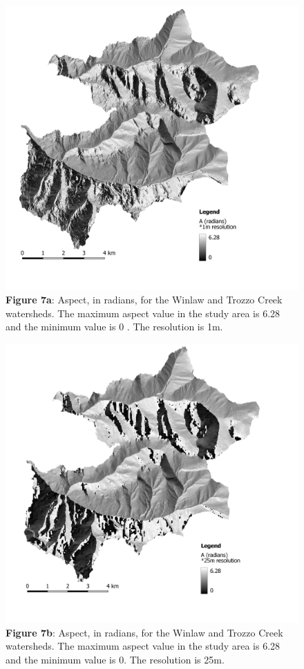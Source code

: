 \documentclass[
]{article}
\begin{document}
\begin{figure}
\centering
\includegraphics{img/aspect_1m.png}
\caption{\textbf{Figure 7a}: Aspect, in radians, for the Winlaw and Trozzo Creek watersheds. The maximum aspect value in the study area is 6.28 and the minimum value is 0 . The resolution is 1m.}
\end{figure}

\begin{figure}
\centering
\includegraphics{img/aspect_25m.png}
\caption{\textbf{Figure 7b}: Aspect, in radians, for the Winlaw and Trozzo Creek watersheds. The maximum aspect value in the study area is 6.28 and the minimum value is 0. The resolution is 25m.}
\end{figure}
\end{document}
